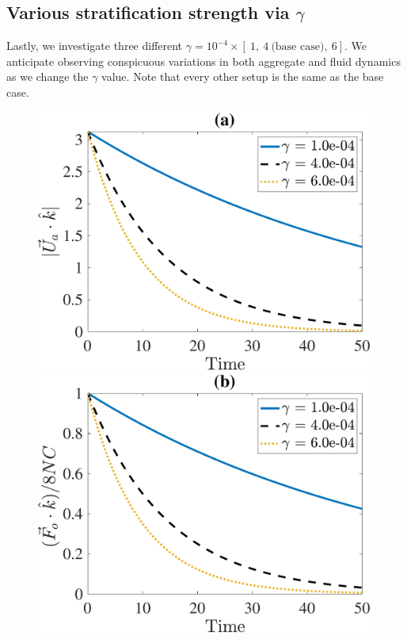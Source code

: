 \subsection{Various stratification strength via $\gamma$}
Lastly, we investigate three different $\gamma = 10^{-4} \times \left[ \ 1, \ 4 \ \text{(base case)}, \  6 \right]$. We anticipate observing conspicuous variations in both aggregate and fluid dynamics as we change the $\gamma$ value. Note that every other setup is the same as the base case. 
\begin{figure}[ht]
	\begin{center}
		\includegraphics[scale=0.35]{./figures/fig_NC50_g_Ua3_all}
		\includegraphics[scale=0.35]{./figures/fig_NC50_g_Fo3_all}

\end{center}
\end{figure}
